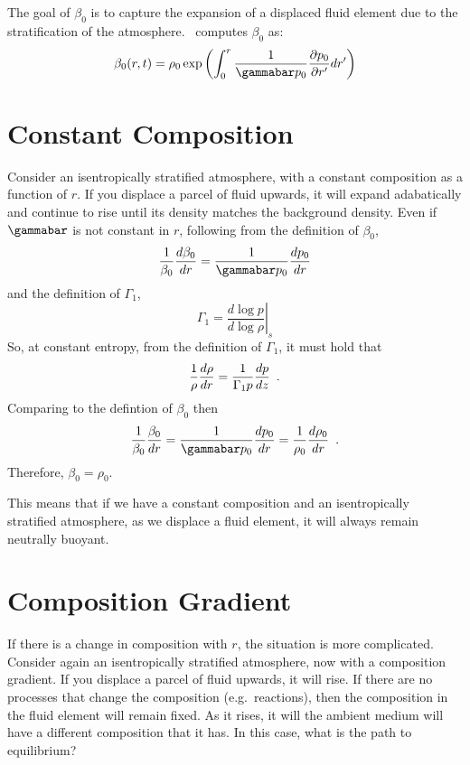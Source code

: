 The goal of $\beta_0$ is to capture the expansion of a displaced fluid
element due to the stratification of the atmosphere.  \maestro\ computes
$\beta_0$ as:
\begin{equation}\label{eq:beta_0}
\beta_0(r,t) = \rho_0 \exp\left (  \int_0^r  \frac{1}{\gammabar p_0} \frac{\partial p_0}{\partial r^\prime} dr^\prime \right )
\end{equation}

\section{Constant Composition}
Consider an isentropically stratified atmosphere, with a constant
composition as a function of $r$.  If you displace a parcel of fluid
upwards, it will expand adabatically and continue to rise until its
density matches the background density.  Even if $\gammabar$ is not
constant in $r$, following from the definition of $\beta_0$,
\begin{equation}
\frac{1}{\beta_0} \frac{d\beta_0}{dr} = \frac{1}{\gammabar p_0} \frac{dp_0}{dr}
\end{equation}
and the definition of $\Gamma_1$,
\begin{equation}
\Gamma_1 = \left . \frac{d \log p}{d \log \rho} \right |_s
\end{equation}
So, at constant entropy, from the definition of $\Gamma_1$, it must hold
that
\begin{equation}
\frac{1}{\rho} \frac{d \rho}{dr} = \frac{1}{\Gamma_1 p} \frac{d p}{dz} \enskip .
\end{equation}
Comparing to the defintion of $\beta_0$ then
\begin{equation}
\frac{1}{\beta_0} \frac{\beta_0}{dr} =\frac{1}{\gammabar p_0}\frac{dp_0}{dr} = \frac{1}{\rho_0} \frac{d\rho_0}{dr}  \enskip .
\end{equation}
Therefore, $\beta_0 = \rho_0$.  

This means that if we have a constant composition and an
isentropically stratified atmosphere, as we displace a fluid element,
it will always remain neutrally buoyant.



\section{Composition Gradient}

If there is a change in composition with $r$, the situation is more
complicated.  Consider again an isentropically stratified atmosphere,
now with a composition gradient.  If you displace a parcel of fluid
upwards, it will rise.  If there are no processes that change the
composition (e.g.\ reactions), then the composition in the fluid
element will remain fixed.  As it rises, it will the ambient medium
will have a different composition that it has.  In this case, what is
the path to equilibrium?

